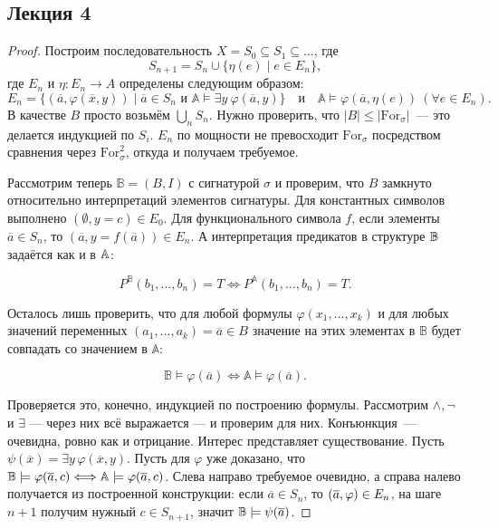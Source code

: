 \subsection{Лекция 4}

\begin{proof}
    Построим последовательность $X = S_0 \subseteq S_1 \subseteq \ldots$, где 
    \[ 
        S_{n+1} = S_n \cup \{\eta(e) \mid e \in E_n\},
    \]
    где $E_n$ и $\eta: E_n \rightarrow A$ определены следующим образом: 
    \[ 
        E_n = \{(\overline{a}, \varphi(\overline{x}, y)) \mid \overline{a} \in S_n \text{ и } \mathbb{A} \models \exists y~\varphi(\overline{a}, y)\}
        \quad\text{и}\quad
        \mathbb{A} \models \varphi(\overline{a}, \eta(e))\ (\forall e \in E_n).
    \]
    В качестве $B$ просто возьмём $\bigcup_n S_n$. Нужно проверить, что $|B| \leq |\text{For}_{\sigma}|$~— это делается индукцией по $S_i$. $E_n$ по мощности не превосходит $\text{For}_{\sigma}$ посредством сравнения через $\text{For}_\sigma^2$, откуда и получаем требуемое. 
    
    Рассмотрим теперь $\mathbb{B} = (B, I)$ с сигнатурой $\sigma$ и проверим, что $B$ замкнуто относительно интерпретаций элементов сигнатуры. Для константных символов выполнено $(\emptyset, y=c)\in E_0$. Для функционального символа $f$, если элементы $\overline{a}\in S_n$, то $(\overline{a}, y = f(\overline{a}))\in E_n$. А интерпретация предикатов в структуре ${\mathbb B}$ задаётся как и в ${\mathbb A}$:

    \[ 
        P^{\mathbb{B}}(b_1, \ldots, b_n)=T \iff P^{\mathbb{A}}(b_1, \ldots, b_n) = T.
    \]

    Осталось лишь проверить, что для любой формулы $\varphi(x_1, \ldots, x_k)$ и для любых значений переменных $(a_1, \ldots, a_k) = \overline{a} \in B$ значение на этих элементах в $\mathbb{B}$ будет совпадать со значением в $\mathbb{A}$: 

    \[ 
        \mathbb{B} \models \varphi(\overline{a}) \Longleftrightarrow \mathbb{A} \models \varphi(\overline{a}).
    \]

    Проверяется это, конечно, индукцией по построению формулы. Рассмотрим $\wedge, \neg$ и $\exists$ — через них всё выражается —  и проверим для них. Конъюнкция~— очевидна, ровно как и отрицание. Интерес представляет существование. Пусть $\psi(\overline{x}) = \exists y\, \varphi(\overline{x}, y)$. Пусть для $\varphi$ уже доказано, что $\mathbb{B} \models \varphi(\overline{a}, c) \Longleftrightarrow \mathbb{A} \models\varphi(\overline{a}, c)$. Слева направо требуемое очевидно, а справа налево получается из построенной конструкции: если $\overline{a}\in S_n$, то $(\overline{a}, \varphi)\in E_n$, на шаге $n+1$ получим нужный $c\in S_{n+1}$, значит ${\mathbb B}\models \psi(\overline{a})$.
\end{proof} 

